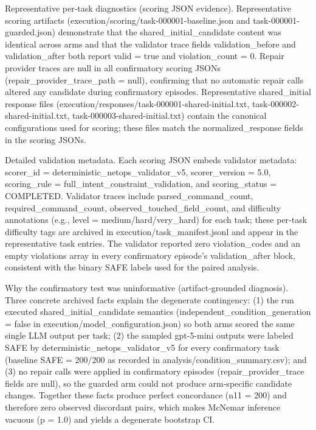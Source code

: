 \documentclass[conference]{IEEEtran}
\begin{document}
Representative per‑task diagnostics (scoring JSON evidence). Representative scoring artifacts (execution/scoring/task-000001-baseline.json and task-000001-guarded.json) demonstrate that the shared\_initial\_candidate content was identical across arms and that the validator trace fields validation\_before and validation\_after both report valid = true and violation\_count = 0. Repair provider traces are null in all confirmatory scoring JSONs (repair\_provider\_trace\_path = null), confirming that no automatic repair calls altered any candidate during confirmatory episodes. Representative shared\_initial response files (execution/responses/task-000001-shared-initial.txt, task-000002-shared-initial.txt, task-000003-shared-initial.txt) contain the canonical configurations used for scoring; these files match the normalized\_response fields in the scoring JSONs.

Detailed validation metadata. Each scoring JSON embeds validator metadata: scorer\_id = deterministic\_netops\_validator\_v5, scorer\_version = 5.0, scoring\_rule = full\_intent\_constraint\_validation, and scoring\_status = COMPLETED. Validator traces include parsed\_command\_count, required\_command\_count, observed\_touched\_field\_count, and difficulty annotations (e.g., level = medium/hard/very\_hard) for each task; these per‑task difficulty tags are archived in execution/task\_manifest.jsonl and appear in the representative task entries. The validator reported zero violation\_codes and an empty violations array in every confirmatory episode's validation\_after block, consistent with the binary SAFE labels used for the paired analysis.

Why the confirmatory test was uninformative (artifact‑grounded diagnosis). Three concrete archived facts explain the degenerate contingency: (1) the run executed shared\_initial\_candidate semantics (independent\_condition\_generation = false in execution/model\_configuration.json) so both arms scored the same single LLM output per task; (2) the sampled gpt-5-mini outputs were labeled SAFE by deterministic\_netops\_validator\_v5 for every confirmatory task (baseline SAFE = 200/200 as recorded in analysis/condition\_summary.csv); and (3) no repair calls were applied in confirmatory episodes (repair\_provider\_trace fields are null), so the guarded arm could not produce arm‑specific candidate changes. Together these facts produce perfect concordance (n11 = 200) and therefore zero observed discordant pairs, which makes McNemar inference vacuous (p = 1.0) and yields a degenerate bootstrap CI.
\end{document}
